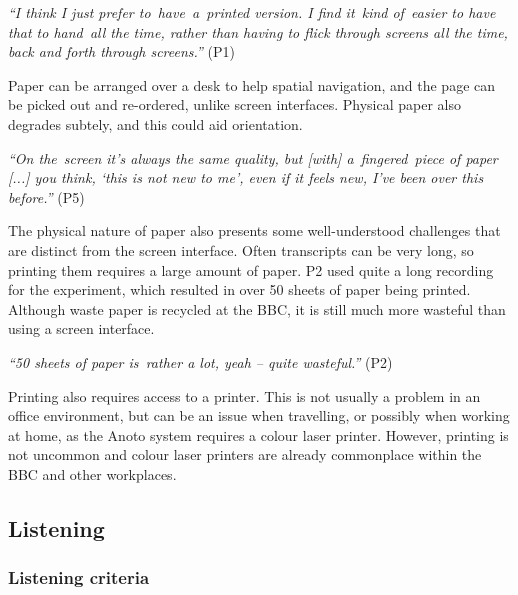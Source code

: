 
\textit{``I think I just prefer to have a printed version. I find it kind of easier to have that to hand all the time,
rather than having to flick through screens all the time, back and forth through screens.''} (P1)

Paper can be arranged over a desk to help spatial navigation, and the page can be picked out and re-ordered, unlike
screen interfaces.
Physical paper also degrades subtely, and this could aid orientation.

\textit{``On the screen it's always the same quality, but [with] a fingered piece of paper [...]
you think, `this is not new to me', even if it feels new, I've been over this before.''} (P5)



The physical nature of paper also presents some well-understood challenges that are distinct from the screen interface.
Often transcripts can be very long, so printing them requires a large amount of paper. P2 used quite a long recording
for the experiment, which resulted in over 50 sheets of paper being printed. Although waste paper is recycled at the
BBC, it is still much more wasteful than using a screen interface.

\textit{``50 sheets of paper is rather a lot, yeah -- quite wasteful.''} (P2)


Printing also requires access to a printer. This is not usually a problem in an office environment, but can be an issue
when travelling, or possibly when working at home, as the Anoto system requires a colour laser printer. However,
printing is not uncommon and colour laser printers are already commonplace within the BBC and other workplaces.

\subsection{Listening}

\subsubsection{Listening criteria}\label{sec:pen-listening-criteria}


